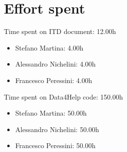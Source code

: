 \documentclass{article}
\begin{document}
\newpage
\section{Effort spent}

Time spent on ITD document: 12.00h
\begin{itemize}
	\item Stefano Martina: 4.00h	
	\item Alessandro Nichelini: 4.00h
	\item Francesco Peressini: 4.00h
\end{itemize}

Time spent on Data4Help code: 150.00h
\begin{itemize}
	\item Stefano Martina: 50.00h
	\item Alessandro Nichelini: 50.00h
	\item Francesco Peressini: 50.00h
\end{itemize}
\end{document}
